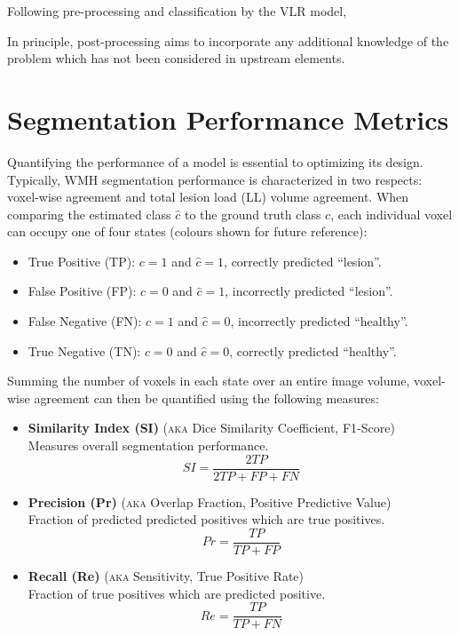 Following pre-processing and classification by the VLR model, 
  
In principle, post-processing aims to incorporate any additional knowledge of the problem which has not been considered in upstream elements. 




\clearpage
\section{Segmentation Performance Metrics}\label{ss:metrics}
Quantifying the performance of a model is essential to optimizing its design.
Typically, WMH segmentation performance is characterized in two respects: voxel-wise agreement and total lesion load (LL) volume agreement.
When comparing the estimated class $\hat{c}$ to the ground truth class $c$, each individual voxel can occupy one of four states (colours shown for future reference):
\begin{itemize}[itemsep=0pt,topsep=0pt]
  \item[\textcolor{green}{\scalebox{0.7}{$\blacksquare$}}] True Positive (TP): $c = 1$ and $\hat{c} = 1$, correctly predicted ``lesion''.
  \item[\textcolor{red}  {\scalebox{0.7}{$\blacksquare$}}] False Positive (FP): $c = 0$ and $\hat{c} = 1$, incorrectly predicted ``lesion''.
  \item[\textcolor{blue} {\scalebox{0.7}{$\blacksquare$}}] False Negative (FN): $c = 1$ and $\hat{c} = 0$, incorrectly predicted ``healthy''.
  \item[\textcolor{black}{\scalebox{0.7}{$\blacksquare$}}] True Negative (TN): $c = 0$ and $\hat{c} = 0$, correctly predicted ``healthy''.
\end{itemize}
Summing the number of voxels in each state over an entire image volume, voxel-wise agreement can then be quantified using the following measures:
\begin{itemize}
  \item \textbf{Similarity Index (SI)}
  (\textsc{aka} Dice Similarity Coefficient, F1-Score)\\
  Measures overall segmentation performance.
  \begin{equation}SI = \dfrac{2TP}{2TP + FP + FN}\end{equation}
  \item \textbf{Precision (Pr)}
  (\textsc{aka} Overlap Fraction, Positive Predictive Value)\\
  Fraction of predicted predicted positives which are true positives.
  \begin{equation}Pr = \dfrac{TP}{TP+FP}\end{equation}
  \item \textbf{Recall (Re)}
  (\textsc{aka} Sensitivity, True Positive Rate)\\
  Fraction of true positives which are predicted positive.
  \begin{equation}Re = \dfrac{TP}{TP+FN}\end{equation}
\end{itemize}
